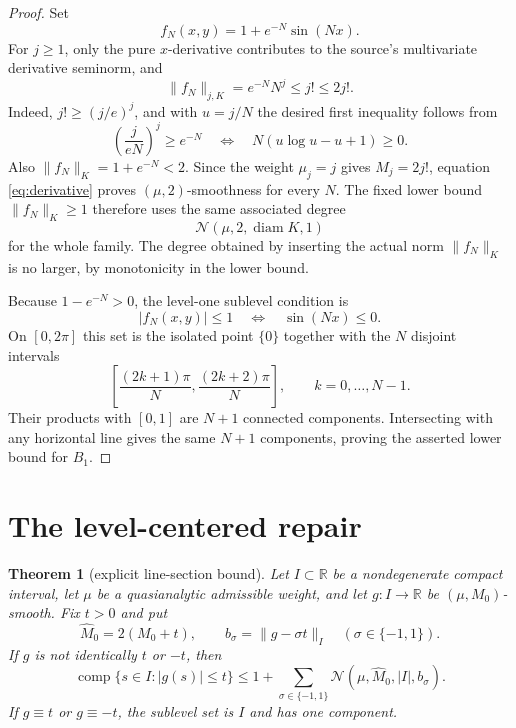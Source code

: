\documentclass[11pt]{article}
\newtheorem{theorem}{Theorem}
\newcommand{\R}{\mathbb R}
\newcommand{\comp}{\operatorname{comp}}
\newcommand{\diam}{\operatorname{diam}}
\begin{document}
\begin{proof}
Set
\[
                  f_N(x,y)=1+e^{-N}\sin(Nx).
\]
For $j\ge1$, only the pure $x$-derivative contributes to the source's
multivariate derivative seminorm, and
\begin{equation}\label{eq:derivative}
                  \|f_N\|_{j,K}=e^{-N}N^j\le j!\le2j!.
\end{equation}
Indeed, $j!\ge(j/e)^j$, and with $u=j/N$ the desired first inequality follows
from
\[
 \left(\frac{j}{eN}\right)^j\ge e^{-N}
 \quad\Longleftrightarrow\quad
 N(u\log u-u+1)\ge0.
\]
Also $\|f_N\|_K=1+e^{-N}<2$.  Since the weight $\mu_j=j$ gives
$M_j=2j!$, equation \eqref{eq:derivative} proves
$(\mu,2)$-smoothness for every $N$.  The fixed lower bound
$\|f_N\|_K\ge1$ therefore uses the same associated degree
\[
                  \mathcal N(\mu,2,\diam K,1)
\]
for the whole family.  The degree obtained by inserting the actual norm
$\|f_N\|_K$ is no larger, by monotonicity in the lower bound.

Because $1-e^{-N}>0$, the level-one sublevel condition is
\[
 |f_N(x,y)|\le1\quad\Longleftrightarrow\quad\sin(Nx)\le0.
\]
On $[0,2\pi]$ this set is the isolated point $\{0\}$ together with the $N$
disjoint intervals
\[
 \left[\frac{(2k+1)\pi}{N},\frac{(2k+2)\pi}{N}\right],
 \qquad k=0,\ldots,N-1.
\]
Their products with $[0,1]$ are $N+1$ connected components.  Intersecting
with any horizontal line gives the same $N+1$ components, proving the asserted
lower bound for $B_1$.
\end{proof}

\section{The level-centered repair}

\begin{theorem}[explicit line-section bound]\label{thm:positive}
Let $I\subset\R$ be a nondegenerate compact interval, let $\mu$ be a
quasianalytic admissible weight, and let $g:I\to\R$ be
$(\mu,M_0)$-smooth.  Fix $t>0$ and put
\[
 \widehat M_0=2(M_0+t),\qquad
 b_\sigma=\|g-\sigma t\|_I\quad(\sigma\in\{-1,1\}).
\]
If $g$ is not identically $t$ or $-t$, then
\begin{equation}\label{eq:component-bound}
 \comp\{s\in I:|g(s)|\le t\}
 \le1+\sum_{\sigma\in\{-1,1\}}
 \mathcal N(\mu,\widehat M_0,|I|,b_\sigma).
\end{equation}
If $g\equiv t$ or $g\equiv-t$, the sublevel set is $I$ and has one component.
\end{theorem}
\end{document}
